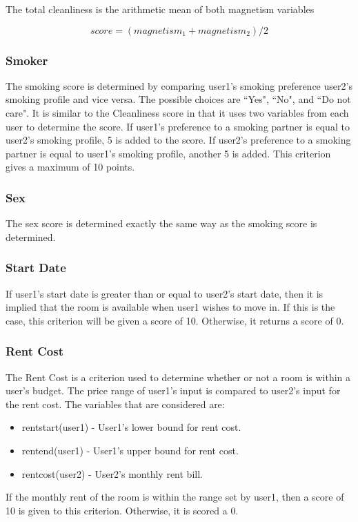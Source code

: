\documentclass[journal]{./IEEE/IEEEtran}
\begin{document}
        The total cleanliness is the arithmetic mean of both magnetism variables

        $$score = (magnetism_1+magnetism_2)/2$$

    \subsubsection{Smoker}
        The smoking score is determined by comparing user1's smoking preference user2's smoking profile and vice versa.
        The possible choices are ``Yes", ``No", and ``Do not care". It is similar to the Cleanliness score in that it
        uses two variables from each user to determine the score. If user1's preference to a smoking partner is equal
        to user2's smoking profile, 5 is added to the score. If user2's preference to a smoking partner is equal to
        user1's smoking profile, another 5 is added. This criterion gives a maximum of 10 points.

    \subsubsection{Sex}
        The sex score is determined exactly the same way as the smoking score is determined.

    \subsubsection{Start Date}
        If user1's start date is greater than or equal to user2's start date, then it is implied that the room is
        available when user1 wishes to move in. If this is the case, this criterion will be given a score of 10.
        Otherwise, it returns a score of 0.

    \subsubsection{Rent Cost}
        The Rent Cost is a criterion used to determine whether or not a room is within a user's budget.
        The price range of user1's input is compared to user2's input for the rent cost. The variables that are
        considered are:
        \begin{itemize}
            \item rent\textunderscore start(user1) - User1's lower bound for rent cost.
            \item rent\textunderscore end(user1) - User1's upper bound for rent cost.
            \item rent\textunderscore cost(user2) - User2's monthly rent bill.
        \end{itemize}
        If the monthly rent of the room is within the range set by user1, then a score of 10 is given to this criterion.
        Otherwise, it is scored a 0.
\end{document}
